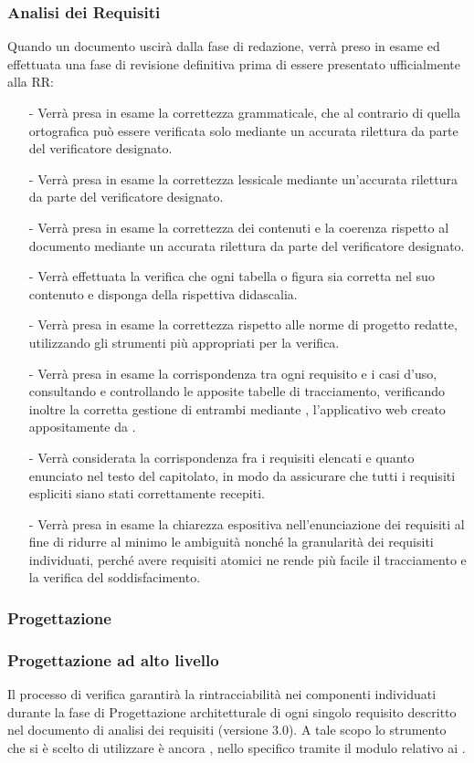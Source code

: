 \subsubsection{Analisi dei Requisiti}
Quando un documento uscirà dalla fase di redazione, verrà preso in esame ed effettuata una fase di revisione definitiva prima di essere presentato ufficialmente alla RR: 
\begin{itemize}
  \item[-] Verrà presa in esame la correttezza grammaticale, che al contrario di quella ortografica può essere verificata solo mediante un accurata rilettura da parte del verificatore designato.
  \item[-] Verrà presa in esame la correttezza lessicale mediante un'accurata rilettura da parte del verificatore designato.
  \item[-] Verrà presa in esame la correttezza dei contenuti e la coerenza rispetto al documento mediante un accurata rilettura da parte del verificatore designato.
  \item[-] Verrà effettuata la verifica che ogni tabella o figura sia corretta nel suo contenuto e disponga della rispettiva didascalia.
  \item[-] Verrà presa in esame la correttezza rispetto alle norme di progetto redatte, utilizzando gli strumenti più appropriati per la verifica.
  \item[-] Verrà presa in esame la corrispondenza tra ogni requisito e i casi d'uso, consultando e controllando le apposite tabelle di tracciamento, verificando inoltre la corretta gestione di entrambi mediante \manager, l'applicativo web creato appositamente da \team.
  \item[-] Verrà considerata la corrispondenza fra i requisiti elencati e quanto enunciato nel testo del capitolato, in modo da assicurare che tutti i requisiti espliciti siano stati correttamente recepiti.
  \item[-] Verrà presa in esame la chiarezza espositiva nell'enunciazione dei requisiti al fine di ridurre al minimo le ambiguità nonché la granularità dei requisiti individuati, perché avere requisiti atomici ne rende più facile il tracciamento e la verifica del soddisfacimento.
\end{itemize}

\subsubsection{Progettazione}

\subsubsection*{Progettazione ad alto livello}
Il processo di verifica garantirà la rintracciabilità nei componenti individuati durante la fase di Progettazione architetturale di ogni singolo requisito descritto nel documento di analisi dei requisiti (versione 3.0). A tale scopo lo strumento che si è scelto di utilizzare è ancora \manager, nello specifico tramite il modulo relativo ai .

